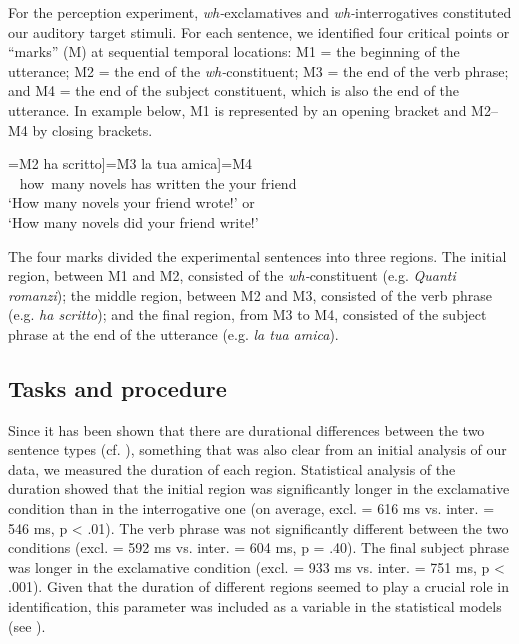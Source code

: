 \documentclass[output=paper]{langsci/langscibook}
\begin{document}
For the perception experiment, \textit{wh-}exclamatives and \textit{wh-}interrogatives constituted our auditory target stimuli. For each sentence, we identified four critical points or “marks” (M) at sequential temporal locations: M1 = the beginning of the utterance; M2 = the end of the \textit{wh-}constituent; M3 = the end of the verb phrase; and M4 = the end of the subject constituent, which is also the end of the utterance. In example  below, M1 is represented by an opening bracket and M2–M4 by closing brackets.


\ea\label{ex:kel:8}
\gll [=M1 Quanti romanzi]=M2 ha scritto]=M3  la   tua    amica]=M4 \\
 ~ how~many novels     has written       the your friend\\
\glt ‘How many novels your friend wrote!’ or \\
\glt ‘How many novels did your friend write!’ 
\z


The four marks divided the experimental sentences into three regions. The initial region, between M1 and M2, consisted of the \textit{wh-}constituent (e.g. \textit{Quanti romanzi}); the middle region, between M2 and M3, consisted of the verb phrase (e.g. \textit{ha scritto}); and the final region, from M3 to M4, consisted of the subject phrase at the end of the utterance (e.g. \textit{la tua amica}).


  
\subsection{Tasks and procedure}
\label{sec:kel:4.2}

Since it has been shown that there are durational differences between the two sentence types (cf. \citealt{Sorianello2011exclamative}), something that was also clear from an initial analysis of our data, we measured the duration of each region. Statistical analysis of the duration showed that the initial region was significantly longer in the exclamative condition than in the interrogative one (on average, excl. = 616 ms vs. inter. = 546 ms, p < .01). The verb phrase was not significantly different between the two conditions (excl. = 592 ms vs. inter. = 604 ms, p = .40). The final subject phrase was longer in the exclamative condition (excl. = 933 ms vs. inter. = 751 ms, p < .001). Given that the duration of different regions seemed to play a crucial role in identification, this parameter was included as a variable in the statistical models (see ).  
\end{document}
